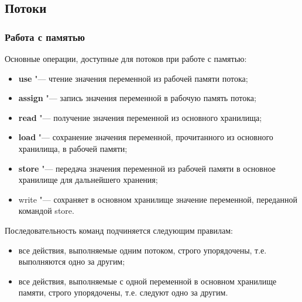 \documentclass[default]{beamer}
\begin{document}
	\subsection{Потоки}
	\begin{frame}
		\frametitle{Работа с памятью}
		
		Основные операции, доступные для потоков при работе с памятью:
		\begin{itemize}
			\item \textbf{use} "--- чтение значения переменной из рабочей памяти потока;
			\item \textbf{assign} "--- запись значения переменной в рабочую память потока;
			\item \textbf{read} "--- получение значения переменной из основного хранилища;
			\item \textbf{load} "--- сохранение значения переменной, прочитанного из основного хранилища, в рабочей памяти;
			\item \textbf{store} "--- передача значения переменной из рабочей памяти в основное хранилище для дальнейшего хранения;
			\item write "--- сохраняет в основном хранилище значение переменной, переданной командой store.
		\end{itemize}
		
		Последовательность команд подчиняется следующим правилам:
		\begin{itemize}
			\item все действия, выполняемые одним потоком, строго упорядочены, т.е. выполняются одно за другим;
			\item все действия, выполняемые с одной переменной в основном хранилище памяти, строго упорядочены, т.е. следуют одно за другим.
		\end{itemize}
		
	\end{frame}
	
\end{document}
